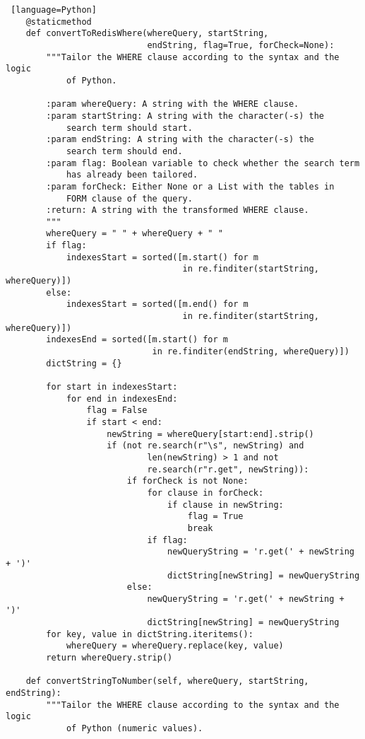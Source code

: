 \documentclass[11pt]{article}
\begin{document}
\begin{lstlisting} [language=Python]
    @staticmethod
    def convertToRedisWhere(whereQuery, startString,
                            endString, flag=True, forCheck=None):
        """Tailor the WHERE clause according to the syntax and the logic
            of Python.

        :param whereQuery: A string with the WHERE clause.
        :param startString: A string with the character(-s) the
            search term should start.
        :param endString: A string with the character(-s) the
            search term should end.
        :param flag: Boolean variable to check whether the search term
            has already been tailored.
        :param forCheck: Either None or a List with the tables in
            FORM clause of the query.
        :return: A string with the transformed WHERE clause.
        """
        whereQuery = " " + whereQuery + " "
        if flag:
            indexesStart = sorted([m.start() for m
                                   in re.finditer(startString, whereQuery)])
        else:
            indexesStart = sorted([m.end() for m
                                   in re.finditer(startString, whereQuery)])
        indexesEnd = sorted([m.start() for m
                             in re.finditer(endString, whereQuery)])
        dictString = {}

        for start in indexesStart:
            for end in indexesEnd:
                flag = False
                if start < end:
                    newString = whereQuery[start:end].strip()
                    if (not re.search(r"\s", newString) and
                            len(newString) > 1 and not
                            re.search(r"r.get", newString)):
                        if forCheck is not None:
                            for clause in forCheck:
                                if clause in newString:
                                    flag = True
                                    break
                            if flag:
                                newQueryString = 'r.get(' + newString + ')'
                                dictString[newString] = newQueryString
                        else:
                            newQueryString = 'r.get(' + newString + ')'
                            dictString[newString] = newQueryString
        for key, value in dictString.iteritems():
            whereQuery = whereQuery.replace(key, value)
        return whereQuery.strip()

    def convertStringToNumber(self, whereQuery, startString, endString):
        """Tailor the WHERE clause according to the syntax and the logic
            of Python (numeric values).


\end{lstlisting}
\end{document}

